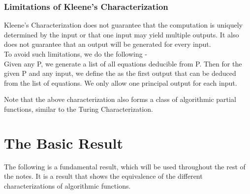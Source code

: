 \documentclass[openany]{book}
\begin{document}
\subsubsection{Limitations of Kleene's Characterization}
Kleene's Characterization does not guarantee that the computation is uniquely determined by the input or that one input may yield multiple outputs. It also does not guarantee that an output will be generated for every input. \\
To avoid such limitations, we do the following - \\
Given any P, we generate a list of all equations deducible from P. Then for the given P and any input, we define the  as the first output that can be deduced from the list of equations. We only allow one principal output for each input.  \\
\begin{mynote}
    Note that the above characterization also forms a class of algorithmic partial functions, similar to the Turing Characterization.  
\end{mynote}
\section{The Basic Result}
The following is a fundamental result, which will be used throughout the rest of the notes. It is a result that shows the equivalence of the different characterizations of algorithmic functions.
\end{document}
